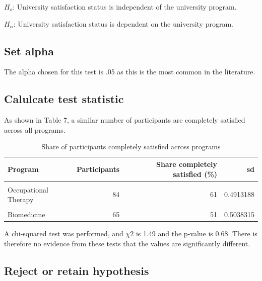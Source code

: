 \documentclass[preprint, 3p,
authoryear]{elsarticle} %
\begin{document}
\(H_o\): University satisfaction status is independent of the university
program.

\(H_\alpha\): University satisfaction status is dependent on the
university program.

\hypertarget{set-alpha-2}{%
\subsection{Set alpha}\label{set-alpha-2}}

The alpha chosen for this test is .05 as this is the most common in the
literature.

\hypertarget{calulcate-test-statistic-2}{%
\subsection{Calulcate test statistic}\label{calulcate-test-statistic-2}}

As shown in Table 7, a similar number of participants are completely
satisfied across all programs.

\begin{table}

\caption{\label{tab:unnamed-chunk-8}Share of participants completely satisfied across programs}
\centering
\fontsize{7}{9}\selectfont
\begin{tabular}[t]{l|r|r|r}
\hline
\textbf{Program} & \textbf{Participants} & \textbf{Share completely satisfied (\%)} & \textbf{sd}\\
\hline
\cellcolor{gray!6}{Nursing} & \cellcolor{gray!6}{59} & \cellcolor{gray!6}{56} & \cellcolor{gray!6}{0.5007300}\\
\hline
Occupational Therapy & 84 & 61 & 0.4913188\\
\hline
\cellcolor{gray!6}{Dentistry} & \cellcolor{gray!6}{42} & \cellcolor{gray!6}{57} & \cellcolor{gray!6}{0.5008703}\\
\hline
Biomedicine & 65 & 51 & 0.5038315\\
\hline
\end{tabular}
\end{table}

A chi-squared test was performed, and \(\chi 2\) is 1.49 and the p-value
is 0.68. There is therefore no evidence from these tests that the values
are significantly different.

\hypertarget{reject-or-retain-hypothesis-2}{%
\subsection{Reject or retain
hypothesis}\label{reject-or-retain-hypothesis-2}}
\end{document}

